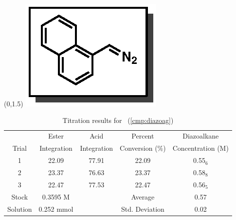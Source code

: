 \begin{singlespace}
\begin{table}[htbp]
\begin{textblock}{1}(0,1.5)
\includegraphics[scale=0.8]{chp_asymmetric/images/diazoag}
\end{textblock}
\flushright
{\small
\begin{tabular}{ccccc} 
\toprule
&Ester&Acid&Percent&Diazoalkane\\
Trial&Integration&Integration&Conversion (\%)&Concentration (M) \\ 
\midrule
1 & 22.09 & 77.91 & 22.09 & 0.55$_6$ \\
2 & 23.37 & 76.63 & 23.37 & 0.58$_8$ \\
3 & 22.47 & 77.53 & 22.47 & 0.56$_5$ \\
\midrule
Stock & 0.3595 M & & Average & 0.57 \\
Solution & 0.252 mmol & & Std. Deviation & 0.02 \\
\bottomrule
\end{tabular}
\caption{Titration results for \CMPdiazoag~(\ref{cmp:diazoag})}
}
\end{table}
\end{singlespace}


